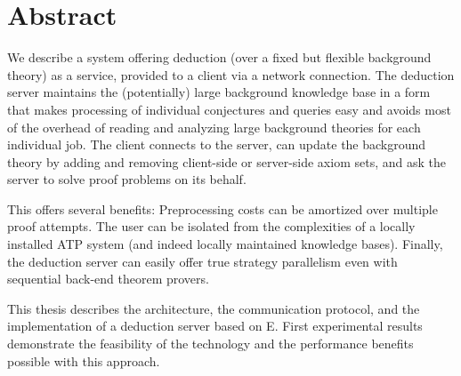 \chapter*{Abstract} 
\label{chap:abstract} 
 
We describe a system offering deduction (over a fixed but flexible background theory) as a service, provided to a client via a network connection. The deduction server maintains the (potentially) large background knowledge base in a form that makes processing of individual conjectures and queries easy and avoids most of the overhead of reading and analyzing large background theories for each individual job. The client connects to the server, can update the background theory by adding and removing client-side or server-side axiom sets, and ask the server to solve proof problems on its behalf. 
 
This offers several benefits: Preprocessing costs can be amortized over multiple proof attempts. The user can be isolated from the complexities of a locally installed ATP system (and indeed locally maintained knowledge bases). Finally, the deduction server can easily offer true strategy parallelism even with sequential back-end theorem provers. 
 
This thesis describes the architecture, the communication protocol, and the implementation of a deduction server based on E. First experimental results demonstrate the feasibility of the technology and the performance benefits possible with this approach.
 
